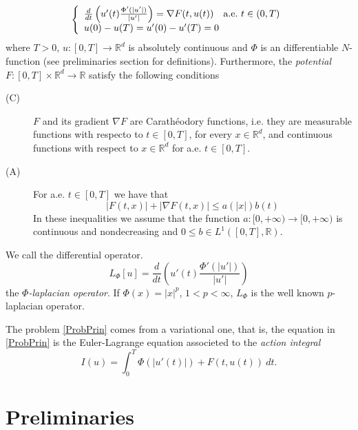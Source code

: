 \documentclass[twoside]{article}
\theoremstyle{remark}
\newcommand{\rr}{\mathbb{R}}
\renewcommand{\leq}{\leqslant}
\begin{document}
\begin{equation}\label{ProbPrin}
    \left\{%
\begin{array}{ll}
   \frac{d}{dt}\left(u'(t)\frac{\Phi'(|u'|)}{|u'|}\right) = \nabla F(t,u(t)) \quad \hbox{a.e.}\ t \in (0,T)\\
    u(0)-u(T)=u'(0)-u'(T)=0
\end{array}%
\right.
\end{equation}
where $T>0$, $u:[0,T]\to\rr^d$ is absolutely continuous and  $\Phi$ is an differentiable  $N$-function (see preliminaries section  for definitions). Furthermore, the \emph{potential} $F:[0,T]\times\rr^d\to\rr$  satisfy the following conditions
\begin{description}

 \item[(C)]\label{item:condicion_c} $F$ and its gradient $\nabla F$ are  Carath\'eodory functions, i.e. they are measurable functions with respecto to $t\in [0,T]$, for every  $x\in\rr^d$, and   continuous functions with  respect to  $x\in\rr^d$ for a.e. $t \in [0,T]$.

 \item[(A)]\label{item:condicion_a}  For   a.e. $t\in [0,T]$ we have that
\begin{equation}
|F(t,x)| + |\nabla F(t,x)|  \leq a(|x|)b(t)
\end{equation}
In these inequalities we assume that the function  $a:[0,+\infty)\to [0,+\infty)$ is continuous and nondecreasing and $0\leq b\in L^1([0,T],\rr)$.


\end{description}

We call the differential operator.
\[L_{\Phi}[u]=\frac{d}{dt}\left(u'(t)\frac{\Phi'(|u'|)}{|u'|}\right) \]
the
\emph{$\Phi$-laplacian operator}. If $\Phi(x)=|x|^p$, $1<p<\infty$, $L_{\Phi}$ is the well known $p$-laplacian operator.



The problem \eqref{ProbPrin} comes from a variational one, that is,  the equation in  \eqref{ProbPrin}  is the Euler-Lagrange equation associeted to the \emph{action integral}
\begin{equation}\label{integral_accion}
I(u)=\int_{0}^T \Phi(|u'(t)|)+F(t,u(t))\ dt.
\end{equation}




\section{Preliminaries}\label{preliminares}
\end{document}
